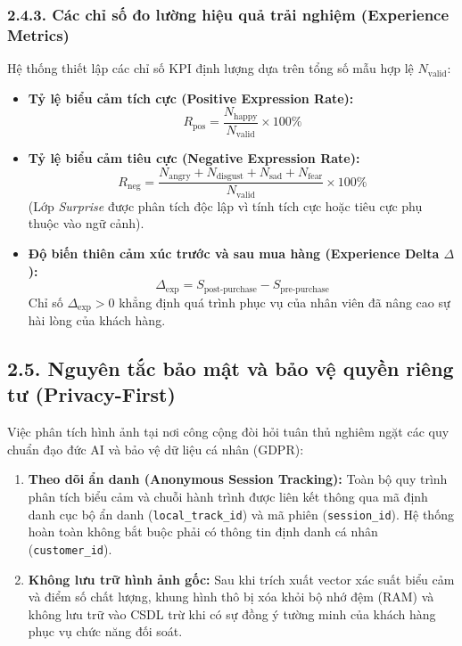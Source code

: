 \subsubsection*{2.4.3. Các chỉ số đo lường hiệu quả trải nghiệm (Experience Metrics)}

Hệ thống thiết lập các chỉ số KPI định lượng dựa trên tổng số mẫu hợp lệ $N_{\text{valid}}$:
\begin{itemize}
    \item \textbf{Tỷ lệ biểu cảm tích cực (Positive Expression Rate):}
    \begin{equation}
    R_{\text{pos}} = \frac{N_{\text{happy}}}{N_{\text{valid}}} \times 100\%
    \end{equation}
    \item \textbf{Tỷ lệ biểu cảm tiêu cực (Negative Expression Rate):}
    \begin{equation}
    R_{\text{neg}} = \frac{N_{\text{angry}} + N_{\text{disgust}} + N_{\text{sad}} + N_{\text{fear}}}{N_{\text{valid}}} \times 100\%
    \end{equation}
    (Lớp \textit{Surprise} được phân tích độc lập vì tính tích cực hoặc tiêu cực phụ thuộc vào ngữ cảnh).
    \item \textbf{Độ biến thiên cảm xúc trước và sau mua hàng (Experience Delta $\Delta$):}
    \begin{equation}
    \Delta_{\text{exp}} = S_{\text{post-purchase}} - S_{\text{pre-purchase}}
    \end{equation}
    Chỉ số $\Delta_{\text{exp}} > 0$ khẳng định quá trình phục vụ của nhân viên đã nâng cao sự hài lòng của khách hàng.
\end{itemize}

\subsection*{2.5. Nguyên tắc bảo mật và bảo vệ quyền riêng tư (Privacy-First)}

Việc phân tích hình ảnh tại nơi công cộng đòi hỏi tuân thủ nghiêm ngặt các quy chuẩn đạo đức AI và bảo vệ dữ liệu cá nhân (GDPR):
\begin{enumerate}
    \item \textbf{Theo dõi ẩn danh (Anonymous Session Tracking):} Toàn bộ quy trình phân tích biểu cảm và chuỗi hành trình được liên kết thông qua mã định danh cục bộ ẩn danh (\texttt{local\_track\_id}) và mã phiên (\texttt{session\_id}). Hệ thống hoàn toàn không bắt buộc phải có thông tin định danh cá nhân (\texttt{customer\_id}).
    \item \textbf{Không lưu trữ hình ảnh gốc:} Sau khi trích xuất vector xác suất biểu cảm và điểm số chất lượng, khung hình thô bị xóa khỏi bộ nhớ đệm (RAM) và không lưu trữ vào CSDL trừ khi có sự đồng ý tường minh của khách hàng phục vụ chức năng đối soát.
\end{enumerate}

\newpage
